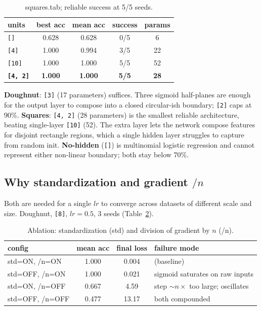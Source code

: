 \documentclass[10pt, a4paper]{article}
\begin{document}
\begin{table}[h]
\centering
\caption{squares.tab; reliable success at 5/5 seeds.}
\label{tab:squares}
\begin{tabular}{lcccc}
\toprule
units & best acc & mean acc & success & params \\
\midrule
\texttt{[]}      & 0.628 & 0.628 & 0/5 & 6 \\
\texttt{[4]}     & 1.000 & 0.994 & 3/5 & 22 \\
\texttt{[10]}    & 1.000 & 1.000 & 5/5 & 52 \\
\textbf{\texttt{[4, 2]}} & \textbf{1.000} & \textbf{1.000} & \textbf{5/5} & \textbf{28} \\
\bottomrule
\end{tabular}
\end{table}

\textbf{Doughnut}: \texttt{[3]} (17 parameters) suffices. Three sigmoid half-planes are enough for the output layer to compose into a closed circular-ish boundary; \texttt{[2]} caps at 90\%. \textbf{Squares}: \texttt{[4, 2]} (28 parameters) is the smallest reliable architecture, beating single-layer \texttt{[10]} (52). The extra layer lets the network compose features for disjoint rectangle regions, which a single hidden layer struggles to capture from random init. \textbf{No-hidden} (\texttt{[]}) is multinomial logistic regression and cannot represent either non-linear boundary; both stay below 70\%.

\subsection{Why standardization and gradient \(/n\)}

Both are needed for a single \(lr\) to converge across datasets of different scale and size. Doughnut, \texttt{[8]}, \(lr=0.5\), 3 seeds (Table~\ref{tab:ablation}).

\begin{table}[h]
\centering
\caption{Ablation: standardization (std) and division of gradient by \(n\) (/n).}
\label{tab:ablation}
\begin{tabular}{lccl}
\toprule
config & mean acc & final loss & failure mode \\
\midrule
std=ON, /n=ON   & 1.000 & 0.004  & (baseline) \\
std=OFF, /n=ON  & 1.000 & 0.021  & sigmoid saturates on raw inputs \\
std=ON, /n=OFF  & 0.667 & 4.59   & step \(\sim n\times\) too large; oscillates \\
std=OFF, /n=OFF & 0.477 & 13.17  & both compounded \\
\bottomrule
\end{tabular}
\end{table}
\end{document}
